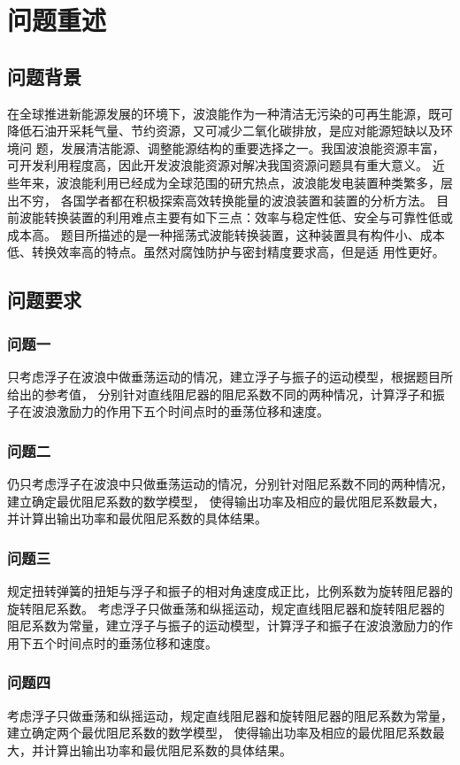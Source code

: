 \section{问题重述}

\subsection{问题背景}
在全球推进新能源发展的环境下，波浪能作为一种清洁无污染的可再生能源，既可
降低石油开采耗气量、节约资源，又可减少二氧化碳排放，是应对能源短缺以及环境问
题，发展清洁能源、调整能源结构的重要选择之一。我国波浪能资源丰富，可开发利用程度高，因此开发波浪能资源对解决我国资源问题具有重大意义。
近些年来，波浪能利用已经成为全球范围的研宄热点，波浪能发电装置种类繁多，层出不穷，
各国学者都在积极探索高效转换能量的波浪装置和装置的分析方法。
目前波能转换装置的利用难点主要有如下三点：效率与稳定性低、安全与可靠性低或成本高。
题目所描述的是一种摇荡式波能转换装置，这种装置具有构件小、成本低、转换效率高的特点。虽然对腐蚀防护与密封精度要求高，但是适
用性更好。





\subsection{问题要求}

\subsubsection{问题一}

只考虑浮子在波浪中做垂荡运动的情况，建立浮子与振子的运动模型，根据题目所给出的参考值，
分别针对直线阻尼器的阻尼系数不同的两种情况，计算浮子和振子在波浪激励力的作用下五个时间点时的垂荡位移和速度。

\subsubsection{问题二}

仍只考虑浮子在波浪中只做垂荡运动的情况，分别针对阻尼系数不同的两种情况，建立确定最优阻尼系数的数学模型，
使得输出功率及相应的最优阻尼系数最大，并计算出输出功率和最优阻尼系数的具体结果。

\subsubsection{问题三}
规定扭转弹簧的扭矩与浮子和振子的相对角速度成正比，比例系数为旋转阻尼器的旋转阻尼系数。
考虑浮子只做垂荡和纵摇运动，规定直线阻尼器和旋转阻尼器的阻尼系数为常量，建立浮子与振子的运动模型，计算浮子和振子在波浪激励力的作用下五个时间点时的垂荡位移和速度。

\subsubsection{问题四}
考虑浮子只做垂荡和纵摇运动，规定直线阻尼器和旋转阻尼器的阻尼系数为常量，建立确定两个最优阻尼系数的数学模型，
使得输出功率及相应的最优阻尼系数最大，并计算出输出功率和最优阻尼系数的具体结果。


